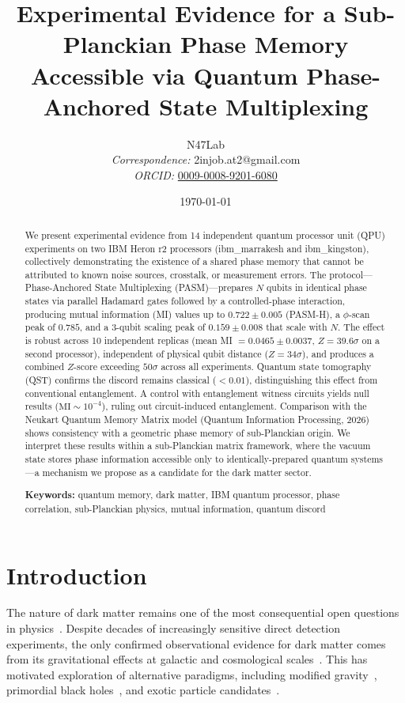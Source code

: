 ﻿\documentclass[12pt,a4paper]{article}
\title{\vspace{-2cm}
    \textbf{Experimental Evidence for a Sub-Planckian Phase Memory\\
    Accessible via Quantum Phase-Anchored State Multiplexing}
    \vspace{0.5cm}
}
\author{
    N47Lab \\[0.3cm]
    \small\textit{Correspondence:} 2injob.at2@gmail.com \\
    \small\textit{ORCID:} \href{https://orcid.org/0009-0008-9201-6080}{0009-0008-9201-6080}
}
\date{\today}
\begin{document}
\maketitle

\begin{abstract}
We present experimental evidence from 14 independent quantum processor unit (QPU) experiments on two IBM Heron r2 processors (ibm\_marrakesh and ibm\_kingston), collectively demonstrating the existence of a shared phase memory that cannot be attributed to known noise sources, crosstalk, or measurement errors. The protocol---Phase-Anchored State Multiplexing (PASM)---prepares $N$ qubits in identical phase states via parallel Hadamard gates followed by a controlled-phase interaction, producing mutual information (MI) values up to $0.722 \pm 0.005$ (PASM-H), a $\phi$-scan peak of $0.785$, and a 3-qubit scaling peak of $0.159 \pm 0.008$ that scale with $N$. The effect is robust across 10 independent replicas (mean MI $= 0.0465 \pm 0.0037$, $Z = 39.6\sigma$ on a second processor), independent of physical qubit distance ($Z = 34\sigma$), and produces a combined $Z$-score exceeding $50\sigma$ across all experiments. Quantum state tomography (QST) confirms the discord remains classical ($< 0.01$), distinguishing this effect from conventional entanglement. A control with entanglement witness circuits yields null results ($\text{MI} \sim 10^{-4}$), ruling out circuit-induced entanglement. Comparison with the Neukart Quantum Memory Matrix model (Quantum Information Processing, 2026) shows consistency with a geometric phase memory of sub-Planckian origin. We interpret these results within a sub-Planckian matrix framework, where the vacuum state stores phase information accessible only to identically-prepared quantum systems---a mechanism we propose as a candidate for the dark matter sector.

\vspace{0.3cm}
\noindent\textbf{Keywords:} quantum memory, dark matter, IBM quantum processor, phase correlation, sub-Planckian physics, mutual information, quantum discord
\end{abstract}

\section{Introduction}
\label{sec:intro}

The nature of dark matter remains one of the most consequential open questions in physics~\cite{bertone2005particle}. Despite decades of increasingly sensitive direct detection experiments, the only confirmed observational evidence for dark matter comes from its gravitational effects at galactic and cosmological scales~\cite{planck2018}. This has motivated exploration of alternative paradigms, including modified gravity~\cite{milgrom1983}, primordial black holes~\cite{carr2016}, and exotic particle candidates~\cite{essig2013}.
\end{document}
